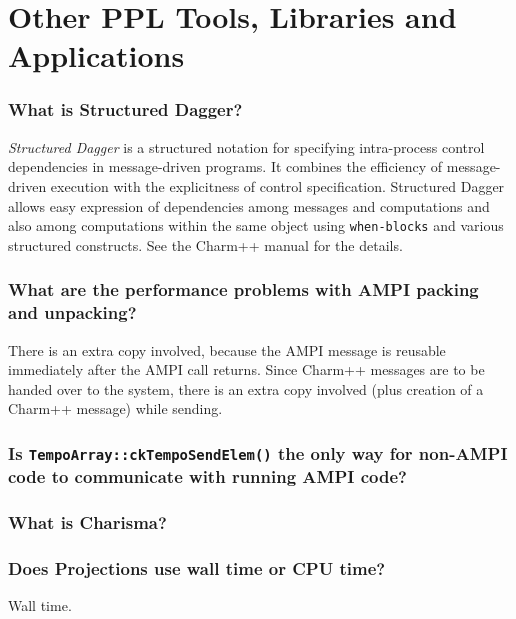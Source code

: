 \section{Other PPL Tools, Libraries and Applications}

\subsubsection{What is Structured Dagger?}

{\em Structured Dagger} is a structured notation for specifying intra-process
control dependencies in message-driven programs. It combines the efficiency
of message-driven execution with the explicitness of control specification.
Structured Dagger allows easy expression of dependencies among messages
and computations and also among computations within the same object using
{\tt when-blocks}
and various structured constructs. See the Charm++ manual for the details.

\subsubsection{What are the performance problems with AMPI packing and unpacking?}

There is an extra copy involved, because the AMPI message is reusable
immediately after the AMPI call returns. Since Charm++ messages are to
be handed over to the system, there is an extra copy involved (plus creation
of a Charm++ message) while sending.



\subsubsection{Is {\tt TempoArray::ckTempoSendElem()} the only way for non-AMPI
code to communicate with running AMPI code?}


\subsubsection{What is Charisma?}


\subsubsection{Does Projections use wall time or CPU time?}

Wall time.
